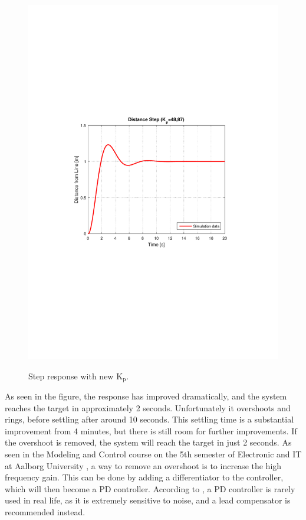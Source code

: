 \begin{figure}[H]
  \centering
  {
    \includegraphics[width=1.4\textwidth]{figures/distanceStep2.pdf}
  }
  \caption{Step response with new $\text{K}_\text{p}$.}
  \label{SimulationSteeringP2}
\end{figure}
As seen in the figure, the response has improved dramatically, and the system reaches the target in approximately 2 seconds. Unfortunately it overshoots and rings, before settling after around 10 seconds. This settling time is a substantial improvement from 4 minutes, but there is still room for further improvements. If the overshoot is removed, the system will reach the target in just 2 seconds.
As seen in the Modeling and Control course on the 5th semester of Electronic and IT at Aalborg University \cite{KMNielsen}, a way to remove an overshoot is to increase the high frequency gain. This can be done by adding a differentiator to the controller, which will then become a PD controller. According to \cite{Franklin}, a PD controller is rarely used in real life, as it is extremely sensitive to noise, and a lead compensator is recommended instead.

